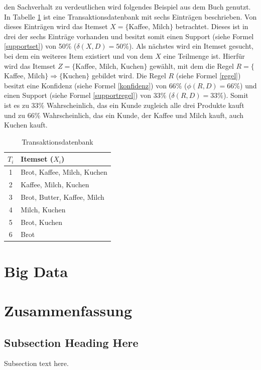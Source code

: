 \documentclass[12pt,journal,compsoc]{IEEEtran}
\begin{document}
 den Sachverhalt zu verdeutlichen wird folgendes Beispiel aus dem Buch \cite{ester2000knowledge} genutzt. In Tabelle \ref{dataass} ist eine Transaktionsdatenbank
mit sechs Einträgen beschrieben. Von dieses Einträgen wird das Itemset $X = \{$Kaffee, Milch$\}$ betrachtet. Dieses ist in drei 
der sechs Einträge vorhanden und besitzt somit einen Support (siehe Formel \ref{supportset}) von 50\% ($\delta(X, D) = 50\%$). Als nächstes wird ein Itemset
gesucht, bei dem ein weiteres Item existiert und von dem $X$ eine Teilmenge ist. Hierfür wird das Itemset $Z = \{$Kaffee, Milch, Kuchen$\}$ gewählt, mit dem die Regel 
$R = \{$Kaffee, Milch$\}\Rightarrow\{$Kuchen$\}$ gebildet wird. Die Regel $R$ (siehe Formel \ref{regel}) besitzt eine Konfidenz (siehe Formel \ref{konfidenz}) von $66\%$ ($\phi(R, D) = 66\%$) und einen Support (siehe Formel \ref{supportregel}) von $33\%$
($\delta(R, D) = 33\%$). 
Somit ist es zu $33\%$ Wahrscheinlich, das ein Kunde zugleich alle drei Produkte kauft und zu $66\%$ Wahrscheinlich, das ein Kunde, der Kaffee und Milch kauft, auch Kuchen kauft.

\begin{table}
\caption{Transaktionsdatenbank}
\centering
\begin{tabular}{c|l}
    	    $T_i$ & Itemset ($X_i$)\\ \hline
    	    1 & Brot, Kaffee, Milch, Kuchen\\
    	    2 & Kaffee, Milch, Kuchen\\
    	    3 & Brot, Butter, Kaffee, Milch\\
    	    4 & Milch, Kuchen\\
    	    5 & Brot, Kuchen\\
    	    6 & Brot
    	    \end{tabular}
\label{dataass}
\end{table}
  
 \section{Big Data}
 \section{Zusammenfassung}

\subsection{Subsection Heading Here}
Subsection text here.
\end{document}
